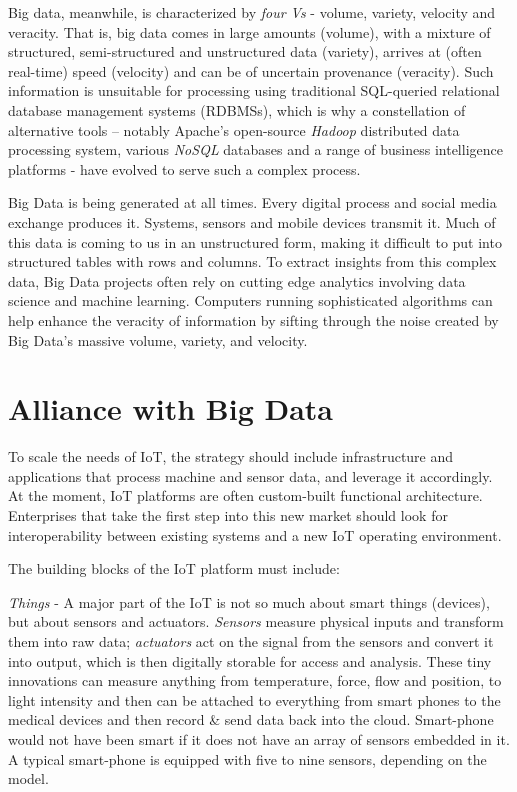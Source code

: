 \documentclass[sigconf]{acmart}
\begin{document}
Big data, meanwhile, is characterized by {\em four Vs} - volume, variety, velocity and veracity\cite{3_wiki_bigdata}. That is, big data comes in large amounts (volume), with a mixture of structured, semi-structured and unstructured data (variety), arrives at (often real-time) speed (velocity) and can be of uncertain provenance (veracity). Such information is unsuitable for processing using traditional SQL-queried relational database management systems (RDBMSs), which is why a constellation of alternative tools -- notably Apache's open-source {\em Hadoop} distributed data processing system, various {\em NoSQL} databases and a range of business intelligence platforms - have evolved to serve such a complex process.

Big Data is being generated at all times. Every digital process and social media exchange produces it. Systems, sensors and mobile devices transmit it. Much of this data is coming to us in an unstructured form, making it difficult to put into structured tables with rows and columns. To extract insights from this complex data, Big Data projects often rely on cutting edge analytics involving data science and machine learning. Computers running sophisticated algorithms can help enhance the veracity of information by sifting through the noise created by Big Data's massive volume, variety, and velocity.

\section{Alliance with Big Data}

To scale the needs of IoT, the strategy should include infrastructure and applications that process machine and sensor data, and leverage it accordingly. At the moment, IoT platforms are often custom-built functional architecture. Enterprises that take the first step into this new market should look for interoperability between existing systems and a new IoT operating environment.

The building blocks of the IoT platform must include:

{\em Things} -  A major part of the IoT is not so much about smart things (devices), but about sensors and actuators. {\em Sensors} measure physical inputs and transform them into raw data; {\em actuators} act on the signal from the sensors and convert it into output, which is then digitally storable for access and analysis.  These tiny innovations can measure anything from temperature, force, flow and position, to light intensity and then can be attached to everything from smart phones to the medical devices and then record \& send data back into the cloud. Smart-phone would not have been smart if it does not have an array of sensors embedded in it\cite{4_Wiley_Book}.  A typical smart-phone is equipped with five to nine sensors, depending on the model. 
\end{document}
